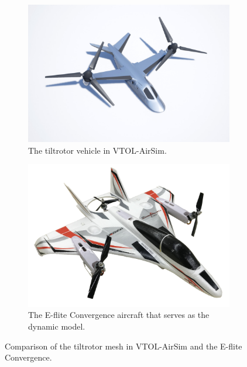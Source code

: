 \begin{figure}[ht]
    \centering
    \begin{subfigure}[b]{0.42\textwidth}
        \includegraphics[width=\textwidth]{figures/tiltrotor_solo3}
        \caption[Tiltrotor vehicle used in VTOL-AirSim]{
            The tiltrotor vehicle in VTOL-AirSim.}%
        \label{fig:tiltrotor_solo}
    \end{subfigure}
    \qquad
    \begin{subfigure}[b]{0.42\textwidth}
        \includegraphics[width=\textwidth]{figures/convergence}
        \caption[E-flite Convergence aircraft]{
            The E-flite Convergence aircraft that serves as the dynamic model.}%
        \label{fig:convergence}
    \end{subfigure}
    \caption[Tiltrotor vehicle in VTOL-AirSim compared with E-flite Convergence]{
        Comparison of the tiltrotor mesh in VTOL-AirSim and the E-flite Convergence.}%
    \label{fig:tiltrotor_convergence}
\end{figure}

